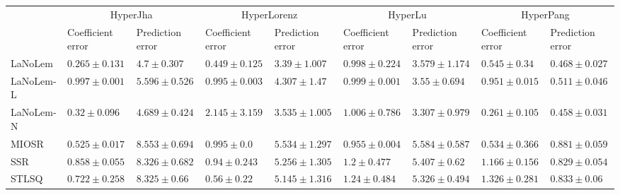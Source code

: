 \begin{table*}
{\begin{tabular}{lllllllll}
 & \multicolumn{2}{c}{HyperJha} & \multicolumn{2}{c}{HyperLorenz} & \multicolumn{2}{c}{HyperLu} & \multicolumn{2}{c}{HyperPang} \\
 & Coefficient error & Prediction error & Coefficient error & Prediction error & Coefficient error & Prediction error & Coefficient error & Prediction error \\
\midrule
LaNoLem & $\mathbf{0.265}\pm 0.131$ & $4.7\pm 0.307$ & $\mathbf{0.449}\pm 0.125$ & $\mathbf{3.39}\pm 1.007$ & $0.998\pm 0.224$ & $3.579\pm 1.174$ & $0.545\pm 0.34$ & $0.468\pm 0.027$ \\
LaNoLem-L & $0.997\pm 0.001$ & $5.596\pm 0.526$ & $0.995\pm 0.003$ & $4.307\pm 1.47$ & $0.999\pm 0.001$ & $3.55\pm 0.694$ & $0.951\pm 0.015$ & $0.511\pm 0.046$ \\
LaNoLem-N & $0.32\pm 0.096$ & $\mathbf{4.689}\pm 0.424$ & $2.145\pm 3.159$ & $3.535\pm 1.005$ & $1.006\pm 0.786$ & $\mathbf{3.307}\pm 0.979$ & $\mathbf{0.261}\pm 0.105$ & $\mathbf{0.458}\pm 0.031$ \\
MIOSR & $0.525\pm 0.017$ & $8.553\pm 0.694$ & $0.995\pm 0.0$ & $5.534\pm 1.297$ & $\mathbf{0.955}\pm 0.004$ & $5.584\pm 0.587$ & $0.534\pm 0.366$ & $0.881\pm 0.059$ \\
SSR & $0.858\pm 0.055$ & $8.326\pm 0.682$ & $0.94\pm 0.243$ & $5.256\pm 1.305$ & $1.2\pm 0.477$ & $5.407\pm 0.62$ & $1.166\pm 0.156$ & $0.829\pm 0.054$ \\
STLSQ & $0.722\pm 0.258$ & $8.325\pm 0.66$ & $0.56\pm 0.22$ & $5.145\pm 1.316$ & $1.24\pm 0.484$ & $5.326\pm 0.494$ & $1.326\pm 0.281$ & $0.833\pm 0.06$ \\

\midrule


\end{tabular}}
\end{table*}

